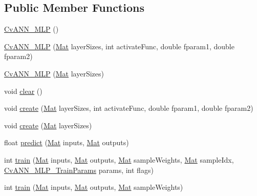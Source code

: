 \subsection*{Public Member Functions}
\begin{DoxyCompactItemize}
\item 
\mbox{\hyperlink{classorg_1_1opencv_1_1ml_1_1_cv_a_n_n___m_l_p_a01276619fc9e17aa4f57ea71b1dfb702}{Cv\+A\+N\+N\+\_\+\+M\+LP}} ()
\item 
\mbox{\hyperlink{classorg_1_1opencv_1_1ml_1_1_cv_a_n_n___m_l_p_a77edc6845f525ca36bea415cb1610f4f}{Cv\+A\+N\+N\+\_\+\+M\+LP}} (\mbox{\hyperlink{classorg_1_1opencv_1_1core_1_1_mat}{Mat}} layer\+Sizes, int activate\+Func, double fparam1, double fparam2)
\item 
\mbox{\hyperlink{classorg_1_1opencv_1_1ml_1_1_cv_a_n_n___m_l_p_a7c931c4344de2afa2eb694bfe23a39d3}{Cv\+A\+N\+N\+\_\+\+M\+LP}} (\mbox{\hyperlink{classorg_1_1opencv_1_1core_1_1_mat}{Mat}} layer\+Sizes)
\item 
void \mbox{\hyperlink{classorg_1_1opencv_1_1ml_1_1_cv_a_n_n___m_l_p_ac0470568d2d81e55c095df852e849b10}{clear}} ()
\item 
void \mbox{\hyperlink{classorg_1_1opencv_1_1ml_1_1_cv_a_n_n___m_l_p_a907ad923ff5493dde694e49e8d02ca47}{create}} (\mbox{\hyperlink{classorg_1_1opencv_1_1core_1_1_mat}{Mat}} layer\+Sizes, int activate\+Func, double fparam1, double fparam2)
\item 
void \mbox{\hyperlink{classorg_1_1opencv_1_1ml_1_1_cv_a_n_n___m_l_p_a9a2158f88f0093884a5bb0804fd96e63}{create}} (\mbox{\hyperlink{classorg_1_1opencv_1_1core_1_1_mat}{Mat}} layer\+Sizes)
\item 
float \mbox{\hyperlink{classorg_1_1opencv_1_1ml_1_1_cv_a_n_n___m_l_p_ab694e4722b8f4f8af388a690be40e511}{predict}} (\mbox{\hyperlink{classorg_1_1opencv_1_1core_1_1_mat}{Mat}} inputs, \mbox{\hyperlink{classorg_1_1opencv_1_1core_1_1_mat}{Mat}} outputs)
\item 
int \mbox{\hyperlink{classorg_1_1opencv_1_1ml_1_1_cv_a_n_n___m_l_p_a76ca0f8c604ca656557e9349ae92d4dc}{train}} (\mbox{\hyperlink{classorg_1_1opencv_1_1core_1_1_mat}{Mat}} inputs, \mbox{\hyperlink{classorg_1_1opencv_1_1core_1_1_mat}{Mat}} outputs, \mbox{\hyperlink{classorg_1_1opencv_1_1core_1_1_mat}{Mat}} sample\+Weights, \mbox{\hyperlink{classorg_1_1opencv_1_1core_1_1_mat}{Mat}} sample\+Idx, \mbox{\hyperlink{classorg_1_1opencv_1_1ml_1_1_cv_a_n_n___m_l_p___train_params}{Cv\+A\+N\+N\+\_\+\+M\+L\+P\+\_\+\+Train\+Params}} params, int flags)
\item 
int \mbox{\hyperlink{classorg_1_1opencv_1_1ml_1_1_cv_a_n_n___m_l_p_ae0d619b9a3ae8bcb5e8838181d38ec1f}{train}} (\mbox{\hyperlink{classorg_1_1opencv_1_1core_1_1_mat}{Mat}} inputs, \mbox{\hyperlink{classorg_1_1opencv_1_1core_1_1_mat}{Mat}} outputs, \mbox{\hyperlink{classorg_1_1opencv_1_1core_1_1_mat}{Mat}} sample\+Weights)
\end{DoxyCompactItemize}
